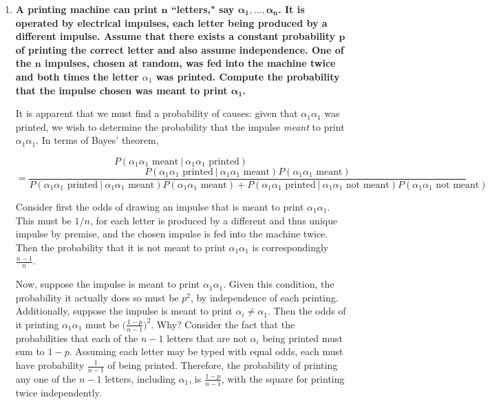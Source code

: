 \documentclass[10pt, oneside]{article}   	%
\theoremstyle{definition}
\begin{document}
\begin{enumerate}[label=3.\arabic*]
\begin{proof}
\end{proof}

\item  \begin{tcolorbox}[
  colback=Cerulean!5!white,
  colframe=Cerulean!75!black]
\textbf{A printing machine can print $\bm{n}$ ``letters," say $\bm{\alpha_1, ..., \alpha_n}$. It is operated by electrical impulses, each letter being produced by a different impulse. Assume that there exists a constant probability $\bm{p}$ of printing the correct letter and also assume independence. One of the $\bm{n}$ impulses, chosen at random, was fed into the machine twice and both times the letter $\alpha_1$ was printed. Compute the probability that the impulse chosen was meant to print $\bm{\alpha_1}$.}
\end{tcolorbox}

It is apparent that we must find a probability of causes: given that $\alpha_1 \alpha_1$ was printed, we wish to determine the probability that the impulse \textit{meant} to print $\alpha_1 \alpha_1$. In terms of Bayes' theorem,

\[ P(\alpha_1 \alpha_1 \text{ meant} \ | \ \alpha_1 \alpha_1 \text{ printed}) \] 
\[ = \frac{P(\alpha_1 \alpha_1 \text{ printed} \ | \ \alpha_1 \alpha_1 \text{ meant}) P(\alpha_1 \alpha_1 \text{ meant})}{P(\alpha_1 \alpha_1 \text{ printed} \ | \ \alpha_1 \alpha_1 \text{ meant}) P(\alpha_1 \alpha_1 \text{ meant}) + P(\alpha_1 \alpha_1 \text{ printed} \ | \ \alpha_1 \alpha_1 \text{ not meant}) P(\alpha_1 \alpha_1 \text{ not meant})} \]

Consider first the odds of drawing an impulse that is meant to print $\alpha_1 \alpha_1$. This must be $1/n$, for each letter is produced by a different and thus unique impulse by premise, and the chosen impulse is fed into the machine twice. Then the probability that it is not meant to print $\alpha_1 \alpha_1$ is correspondingly $\frac{n-1}{n}$.

Now, suppose the impulse is meant to print $\alpha_1 \alpha_1$. Given this condition, the probability it actually does so must be $p^2$, by independence of each printing. Additionally, suppose the impulse is meant to print $\alpha_i \neq \alpha_1$. Then the odds of it printing $\alpha_1 \alpha_1$ must be $\big( \frac{1-p}{n-1} \big)^2$. Why? Consider the fact that the probabilities that each of the $n-1$ letters that are not $\alpha_i$ being printed must sum to $1-p$. Assuming each letter may be typed with equal odds, each must have probability $\frac{1}{n-1}$ of being printed. Therefore, the probability of printing any one of the $n-1$ letters, including $\alpha_1$, is $\frac{1-p}{n-1}$, with the square for printing twice independently.


\end{enumerate}
\end{document}
